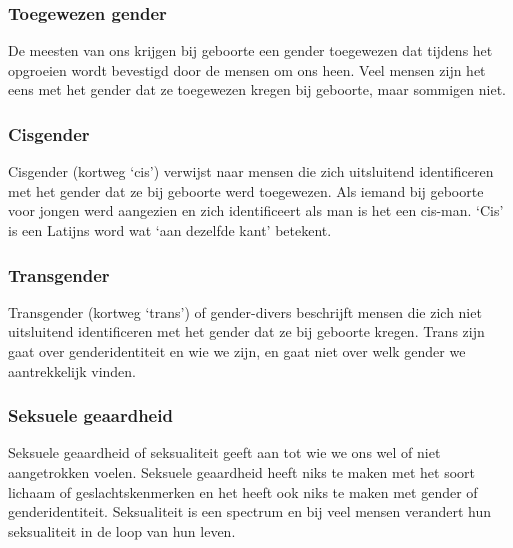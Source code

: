 \documentclass[12pt,openany]{book}
\begin{document}
\subsubsection*{Toegewezen gender}

De meesten van ons krijgen bij geboorte een gender toegewezen dat tijdens het opgroeien wordt bevestigd door de mensen om ons heen. Veel mensen zijn het eens met het gender dat ze toegewezen kregen bij geboorte, maar sommigen niet.  

\subsubsection*{Cisgender}

Cisgender (kortweg ‘cis’) verwijst naar mensen die zich uitsluitend identificeren met het gender dat ze bij geboorte werd toegewezen. Als iemand bij geboorte voor jongen werd aangezien en zich identificeert als man is het een cis-man. ‘Cis’ is een Latijns word wat ‘aan dezelfde kant’ betekent. 

\begin{figure}[h]
    \centering
\end{figure}

\subsubsection*{Transgender} 

Transgender (kortweg ‘trans’) of gender-divers beschrijft mensen die zich niet uitsluitend identificeren met het gender dat ze bij geboorte kregen. Trans zijn gaat over genderidentiteit en wie we zijn, en gaat niet over welk gender we aantrekkelijk vinden.

\subsubsection*{Seksuele geaardheid} 

Seksuele geaardheid of seksualiteit geeft aan tot wie we ons wel of niet aangetrokken voelen. Seksuele geaardheid heeft niks te maken met het soort lichaam of geslachtskenmerken en het heeft ook niks te maken met gender of genderidentiteit. Seksualiteit is een spectrum en bij veel mensen verandert hun seksualiteit in de loop van hun leven.
\end{document}
